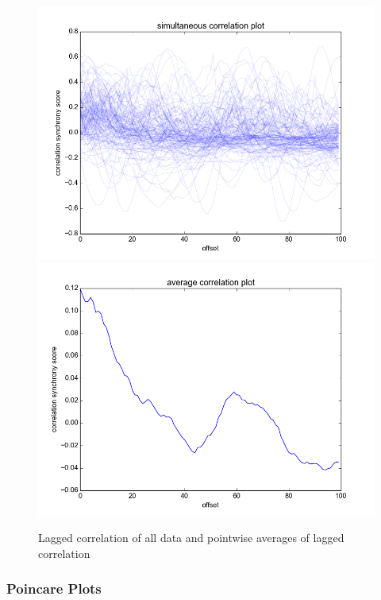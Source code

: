 \documentclass[12pt]{article}
\begin{document}
\begin{figure}\label{fig:lag_correlation}
  \begin{center}
    \includegraphics[scale=0.6]{correlation_mc} %
    \includegraphics[scale=0.6]{correlation_summary}
  \end{center}
  \caption{Lagged correlation of all data and pointwise averages of lagged correlation}
\end{figure}

\subsubsection{Poincare Plots}

\end{document}
